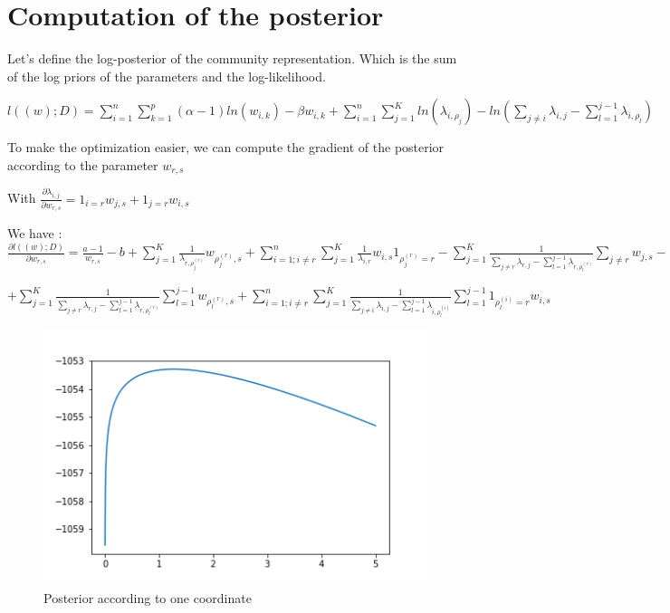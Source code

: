 \documentclass[12pt]{ociamthesis}  %
\begin{document}
	\section{Computation of the posterior}
	Let's define the log-posterior of the community representation. Which is the sum of the log priors of the parameters and the log-likelihood. 
	
	$l((w);D) = \sum_{i = 1}^{n} \sum_{k = 1}^{p} (\alpha - 1)ln(w_{i,k}) - \beta w_{i,k} + \sum_{i = 1}^{n} \sum_{j = 1}^{K} ln(\lambda_{i,\rho_{j}}) - ln(\sum_{j \neq i} \lambda_{i,j} - \sum_{l = 1}^{j-1} \lambda_{i,\rho_{l}})$
	
	To make the optimization easier, we can compute the gradient of the posterior according to the parameter $w_{r,s}$
	
	With $\frac{\partial \lambda_{i,j}}{\partial w_{r,s}} = 1_{i = r} w_{j,s} + 1_{j = r} w_{i,s}$
	
	We have :
	$\frac{\partial l((w);D)}{\partial w_{r,s}} = \frac{a-1}{w_{r,s}} - b 
	+ \sum_{j = 1}^{K} \frac{1}{\lambda_{r,\rho^{(r)}_{j}}} w_{\rho^{(r)}_{j},s} 
	+ \sum_{i = 1; i \neq r}^{n} \sum_{j = 1}^{K} \frac{1}{\lambda_{i,r}} w_{i,s} 1_{\rho^{(r)}_{j} = r}
	- \sum_{j = 1}^{K} \frac{1}{\sum_{j \neq r} \lambda_{r,j} - \sum_{l = 1}^{j - 1} \lambda_{r,\rho^{(r)}_{l}}} \sum_{j \neq r} w_{j,s}
	- \sum_{i = 1; i \neq r}^{n} \sum_{j = 1}^{K} \frac{1}{\sum_{j \neq i} \lambda_{i,j} - \sum_{l = 1}^{j - 1} \lambda_{i,\rho^{(i)}_{l}}} w_{i,s}$
	
	$ + \sum_{j = 1}^{K} \frac{1}{\sum_{j \neq r} \lambda_{r,j} - \sum_{l = 1}^{j - 1} \lambda_{r,\rho^{(r)}_{l}}} \sum_{l = 1}^{j-1} w_{\rho^{(r)}_{l},s}
	+ \sum_{i = 1; i \neq r}^{n} \sum_{j = 1}^{K} \frac{1}{\sum_{j \neq i} \lambda_{i,j} - \sum_{l = 1}^{j - 1} \lambda_{i,\rho^{(i)}_{l}}} \sum_{l = 1}^{j - 1} 1_{\rho^{(i)}_{l} = r} w_{i,s}$
	
	\begin{figure}
		\centering
		\includegraphics[width=\textwidth,height=\textheight,keepaspectratio]{CoordinateWiseFunction}
		\caption{Posterior according to one coordinate}
	\end{figure}
	
\end{document}
